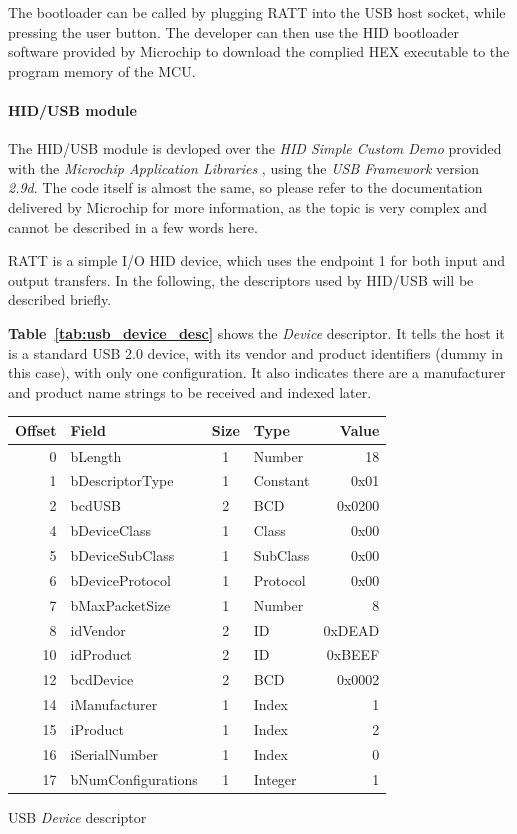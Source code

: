 \documentclass[a4paper,10pt]{article}
\makeatletter
\newenvironment{tablehere}{\def\@captype{table}\vspace{2ex}}{\vspace{2ex}}
\newcommand{\citet}[1]{\textbf{Table~\ref{#1}}}
\makeatother
\begin{document}
\begin{multicols}{2}
The bootloader can be called by plugging RATT into the USB host socket, while
pressing the user button. The developer can then use the HID bootloader
software provided by Microchip to download the complied HEX executable to the
program memory of the MCU.


\paragraph{HID/USB module}
The HID/USB module is devloped over the \emph{HID Simple Custom Demo}
provided with the \emph{Microchip Application Libraries} \cite{microchip_mal},
using the \emph{USB Framework} version \emph{2.9d}. The code itself is almost
the same, so please refer to the documentation delivered by Microchip for more
information, as the topic is very complex and cannot be described in a few
words here.

RATT is a simple I/O HID device, which uses the endpoint 1 for both input and
output transfers. In the following, the descriptors used by HID/USB will be
described briefly.

\citet{tab:usb_device_desc} shows the \emph{Device} descriptor. It tells the
host it is a standard USB 2.0 device, with its vendor and product identifiers
(dummy in this case), with only one configuration. It also indicates there
are a manufacturer and product name strings to be received and indexed later.

\begin{tablehere}
\centering \footnotesize
\begin{tabular}{|r|l|c|l|r|}
\hline
\textbf{Offset} & \textbf{Field} & \textbf{Size} & \textbf{Type} & \textbf{Value}	\\
\hline
0	& bLength				& 1	& Number	& 18		\\
1	& bDescriptorType		& 1	& Constant	& 0x01		\\
2	& bcdUSB				& 2	& BCD		& 0x0200	\\
4	& bDeviceClass			& 1	& Class		& 0x00		\\
5	& bDeviceSubClass		& 1	& SubClass	& 0x00		\\
6	& bDeviceProtocol		& 1	& Protocol	& 0x00		\\
7	& bMaxPacketSize		& 1	& Number	& 8			\\
8	& idVendor				& 2	& ID		& 0xDEAD	\\
10	& idProduct				& 2	& ID		& 0xBEEF	\\
12	& bcdDevice				& 2	& BCD		& 0x0002	\\
14	& iManufacturer			& 1	& Index		& 1			\\
15	& iProduct				& 1	& Index		& 2			\\
16	& iSerialNumber			& 1	& Index		& 0			\\
17	& bNumConfigurations	& 1	& Integer	& 1			\\
\hline
\end{tabular}
\caption{USB \emph{Device} descriptor}
\label{tab:usb_device_desc}
\end{tablehere}


\end{multicols}
\end{document}
